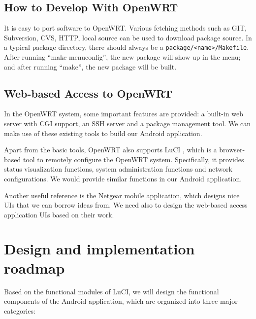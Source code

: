 \documentclass{sig-alternate-05-2015}
\begin{document}
	\subsection{How to Develop With OpenWRT}
	
	It is easy to port software to OpenWRT. Various fetching methods such as GIT, Subversion, CVS, HTTP, local source can be used to download package source. In a typical package directory, there should always be a \verb|package/<name>/Makefile|. After running ``make menuconfig'', the new package will show up in the menu; and after running ``make'', the new package will be built.
	
	\subsection{Web-based Access to OpenWRT}
	In the OpenWRT system, some important features are provided: a built-in web server with CGI support, an SSH server and a package management tool. We can make use of these existing tools to build our Android application.
	
	Apart from the basic tools, OpenWRT also supports LuCI \cite{LuCI}, which is a browser-based tool to remotely configure the OpenWRT system. Specifically, it provides status visualization functions, system administration functions and network configurations. We would provide similar functions in our Android application.
	
	Another useful reference is the Netgear \cite{netgear} mobile application, which designs nice UIs that we can borrow ideas from. We need also to design the web-based access application UIs based on their work.
	
	\section{Design and implementation \\ roadmap}
	
	Based on the functional modules of LuCI, we will design the functional components of the Android application, which are organized into three major categories:
	
\end{document}
